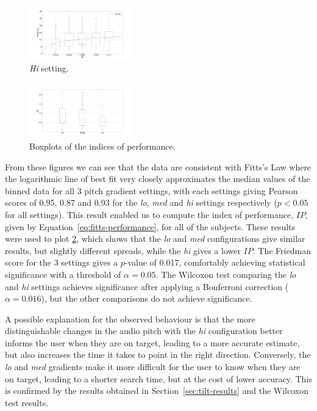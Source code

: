 \documentclass[sigconf, screen=true, anonymous=true]{acmart}
\begin{document}
\begin{figure}
  \centering
  \includegraphics[clip, trim=120 20 120 20, width=0.4\textwidth]{figures/fitts_hi.png}
  \caption{\emph{Hi} setting. }\label{fig:fitts-hi}
\end{figure}

\begin{figure}
  \centering
  \includegraphics[clip, trim=90 20 130 20, width=0.4\textwidth]{figures/fitts_performance.png}
  \caption{Boxplots of the indices of performance.}\label{fig:fitts-performance}
\end{figure}

From these figures we can see that the data are consistent with Fitts's Law where the logarithmic line of best fit very closely approximates the median values of the binned data for all 3 pitch gradient settings, with each settings giving Pearson scores of 0.95, 0.87 and 0.93 for the \emph{lo}, \emph{med} and \emph{hi} settings respectively ($p < 0.05$ for all settings). 
This result enabled us to compute the index of performance, $IP$, given by Equation~\ref{eq:fitts-performance}, for all of the subjects.
These results were used to plot \cref{fig:fitts-performance}, which shows that the \emph{lo} and \emph{med} configurations give similar results, but slightly different spreads, while the \emph{hi} gives a lower $IP$.
The Friedman score for the 3 settings gives a $p$-value of 0.017, comfortably achieving statistical significance with a threshold of $\alpha=0.05$.
The Wilcoxon test comparing the \emph{lo} and \emph{hi} settings achieves significance after applying a Bonferroni correction ($\alpha=0.016$), but the other comparisons do not achieve significance. 

A possible explanation for the observed behaviour is that the more distinguishable changes in the audio pitch with the \emph{hi} configuration better informs the user when they are on target, leading to a more accurate estimate, but also increases the time it takes to point in the right direction.
Conversely, the \emph{lo} and \emph{med} gradients make it more difficult for the user to know when they are on target, leading to a shorter search time, but at the cost of lower accuracy.
This is confirmed by the results obtained in Section~\ref{sec:tilt-results} and the Wilcoxon test results. 
\end{document}
